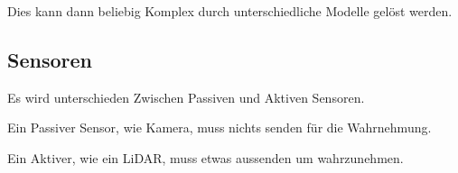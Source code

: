 \documentclass[a4paper]{article}
\begin{document}
Dies kann dann beliebig Komplex durch unterschiedliche Modelle gelöst werden.

\subsection{Sensoren}

Es wird unterschieden Zwischen Passiven und Aktiven Sensoren.

Ein Passiver Sensor, wie Kamera, muss nichts senden für die Wahrnehmung.

Ein Aktiver, wie ein LiDAR, muss etwas aussenden um wahrzunehmen.
\end{document}
